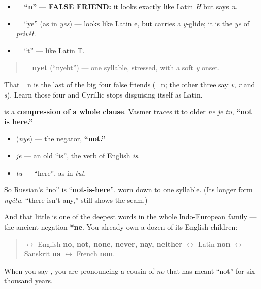 \begin{itemize}
\raggedright
  \item \textbf{} = \textbf{\textquotedblleft{}n\textquotedblright{}} — \textbf{FALSE FRIEND:} it looks exactly like Latin \emph{H} but says \emph{n}.
  \item \textbf{} = \textquotedblleft{}ye\textquotedblright{} (as in \emph{yes}) — looks like Latin e, but carries a \emph{y}-glide; it is the \emph{ye} of \emph{privét}.
  \item \textbf{} = \textquotedblleft{}t\textquotedblright{} — like Latin T.
\end{itemize}

\begin{quote}
\textbf{} = \textbf{nyet} (\textquotedblleft{}nyeht\textquotedblright{}) — one syllable, stressed, with a soft \emph{y} onset.
\end{quote}

That \textbf{}=n is the last of the big four false friends (=n; the other three say \emph{v}, \emph{r} and \emph{s}). Learn those four and Cyrillic stops disguising itself as Latin.

\begin{cousinweb}
\textbf{} is a \textbf{compression of a whole clause}. Vasmer traces it to older \emph{ne je tu}, \textbf{\textquotedblleft{}not is here.\textquotedblright{}}

\begin{itemize}
\raggedright
  \item \textbf{} (\emph{nye}) — the negator, \textbf{\textquotedblleft{}not.\textquotedblright{}}
  \item \emph{je} — an old \textquotedblleft{}is\textquotedblright{}, the verb of English \emph{is}.
  \item \emph{tu} — \textquotedblleft{}here\textquotedblright{}, as in \emph{tut}.
\end{itemize}

So Russian's \textquotedblleft{}no\textquotedblright{} is \textquotedblleft{}\textbf{not-is-here}\textquotedblright{}, worn down to one syllable. (Its longer form \emph{nyétu}, \textquotedblleft{}there isn't any,\textquotedblright{} still shows the seam.)

And that little \textbf{} is one of the deepest words in the whole Indo-European family — the ancient negation \textbf{*ne}. You already own a dozen of its English children:

\begin{quote}
\textbf{} $\leftrightarrow$ English \textbf{no, not, none, never, nay, neither} $\leftrightarrow$ Latin \textbf{nōn} $\leftrightarrow$ Sanskrit \textbf{na} $\leftrightarrow$ French \textbf{non}.
\end{quote}

When you say \emph{}, you are pronouncing a cousin of \emph{no} that has meant \textquotedblleft{}not\textquotedblright{} for six thousand years.
\end{cousinweb}


